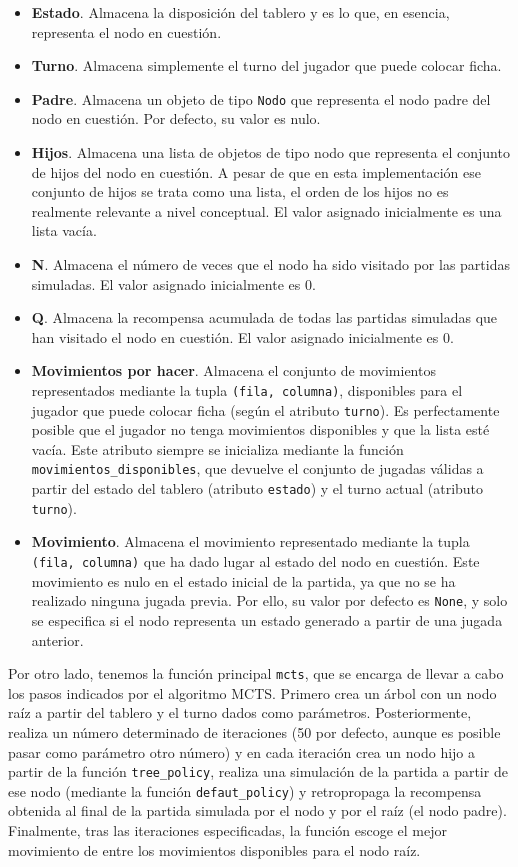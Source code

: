 \documentclass[conference]{IEEEtran}
\begin{document}
\begin{itemize}
    \item \textbf{Estado}. Almacena la disposición del tablero y es lo que, en esencia, representa el nodo en cuestión.
    \item \textbf{Turno}. Almacena simplemente el turno del jugador que puede colocar ficha.
    \item \textbf{Padre}. Almacena un objeto de tipo \texttt{Nodo} que representa el nodo padre del nodo en cuestión. Por defecto, su valor es nulo.
    \item \textbf{Hijos}. Almacena una lista de objetos de tipo nodo que representa el conjunto de hijos del nodo en cuestión. A pesar de que en esta implementación ese conjunto de hijos se trata como una lista, el orden de los hijos no es realmente relevante a nivel conceptual. El valor asignado inicialmente es una lista vacía.
    \item \textbf{N}. Almacena el número de veces que el nodo ha sido visitado por las partidas simuladas. El valor asignado inicialmente es 0.
    \item \textbf{Q}. Almacena la recompensa acumulada de todas las partidas simuladas que han visitado el nodo en cuestión. El valor asignado inicialmente es 0.
    \item \textbf{Movimientos por hacer}. Almacena el conjunto de movimientos representados mediante la tupla \texttt{(fila, columna)}, disponibles para el jugador que puede colocar ficha (según el atributo \texttt{turno}). Es perfectamente posible que el jugador no tenga movimientos disponibles y que la lista esté vacía. Este atributo siempre se inicializa mediante la función \texttt{movimientos\_disponibles}, que devuelve el conjunto de jugadas válidas a partir del estado del tablero (atributo \texttt{estado}) y el turno actual (atributo \texttt{turno}).
    \item \textbf{Movimiento}. Almacena el movimiento representado mediante la tupla \texttt{(fila, columna)} que ha dado lugar al estado del nodo en cuestión. Este movimiento es nulo en el estado inicial de la partida, ya que no se ha realizado ninguna jugada previa. Por ello, su valor por defecto es \texttt{None}, y solo se especifica si el nodo representa un estado generado a partir de una jugada anterior.
\end{itemize}

Por otro lado, tenemos la función principal \texttt{mcts}, que se encarga de llevar a cabo los pasos indicados por el algoritmo MCTS. Primero crea un árbol con un nodo raíz a partir del tablero y el turno dados como parámetros. Posteriormente, realiza un número determinado de iteraciones (50 por defecto, aunque es posible pasar como parámetro otro número) y en cada iteración crea un nodo hijo a partir de la función \texttt{tree\_policy}, realiza una simulación de la partida a partir de ese nodo (mediante la función \texttt{defaut\_policy}) y retropropaga la recompensa obtenida al final de la partida simulada por el nodo y por el raíz (el nodo padre). Finalmente, tras las iteraciones especificadas, la función escoge el mejor movimiento de entre los movimientos disponibles para el nodo raíz.
\end{document}
